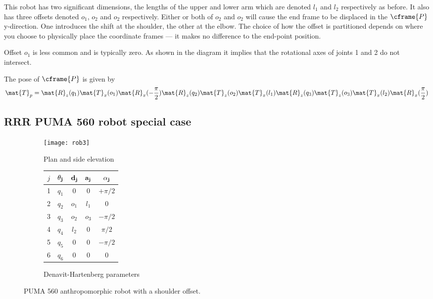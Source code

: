 \documentclass[11pt]{article}
\numberwithin{equation}{section}
\begin{document}
This robot has two significant dimensions, the lengths of the upper and lower arm which are denoted $l_1$ and $l_2$ respectively as before.
It also has three offsets denoted $o_1$, $o_2$ and $o_2$ respectively.  
Either or both of $o_2$ and $o_2$ will cause the
end frame to be displaced in the $\cframe{P}$ y-direction.  One introduces the shift at the shoulder, the other at the elbow.
The choice of how the offset is partitioned depends on where you choose to physically place the coordinate frames --- it makes no difference to the end-point position.

Offset $o_1$ is less common and is typically zero.  As shown in the diagram it implies that the rotational axes of joints 1 and 2 do not 
intersect.

The pose of $\cframe{P}$ is given by
\[
\mat{T}_p = \mat{R}_z(q_1) \mat{T}_x(o_1) \mat{R}_x(-\frac{\pi}{2}) \mat{R}_z(q_2)  \mat{T}_z(o_2) \mat{T}_x(l_1) \mat{R}_z(q_3) \mat{T}_z(o_3) \mat{T}_x(l_2) \mat{R}_x(\frac{\pi}{2})
\]

\pagebreak


\subsection{RRR PUMA 560 robot special case}\label{sec:puma560}

	\begin{figure}[h]
	\centering
	\begin{subfigure}[b]{0.6\textwidth}
		\centering
		\texttt{[image: rob3]}
		\caption{Plan and side elevation}
	\label{fig:rob3} 
	\end{subfigure}
	\begin{subfigure}[b]{0.3\textwidth}
		\begin{tabular}{|c|c|c|c|c|} \hline
			$j$ & $\bf \theta_j$ & $\bf d_j$ & $\bf a_j$ & $\bf \alpha_j$ \\ \hline
			\rowcolor{SkyBlue}1 &  $q_1$ & \cellcolor{White} 0 &  0 & $+\pi/2$ \\
			\rowcolor{SkyBlue}2 &  $q_2$ & $o_1$ & $l_1$& 0 \\
			\rowcolor{SkyBlue}3 & $q_3$ & $o_2$ &$o_3$  & $-\pi/2$ \\
			\rowcolor{Peach}4 &  $q_4$ & \cellcolor{SkyBlue} $l_2$  & 0 & $\pi/2$ \\
			\rowcolor{Peach}5 &$q_5$ & 0 & 0 & $-\pi/2$ \\
			\cellcolor{Peach} 6 & \cellcolor{Peach} $q_6$ &0  &0  & 0 \\ \hline
		\end{tabular}
		\caption{Denavit-Hartenberg parameters}
		\label{fig:dh3}
	\end{subfigure}
	\caption{PUMA 560 anthropomorphic robot with a shoulder offset.}
	\end{figure}
\end{document}
